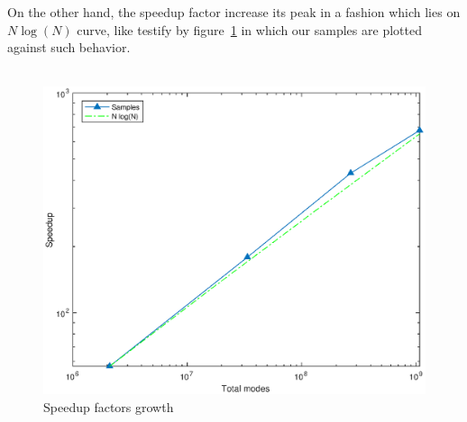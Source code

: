 On the other hand, the speedup factor increase its peak in a fashion which lies on $N\log(N)$ curve, like testify by figure~\ref{speedup:trend} in which our samples are plotted against such behavior. \\~\par
\begin{figure}
\begin{center}
\includegraphics[scale=0.55]{grafici/speedup_trend}
\caption{Speedup factors growth}
\label{speedup:trend}
\end{center}
\end{figure}
\par

